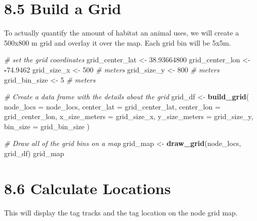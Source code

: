 \documentclass[
]{book}
\newenvironment{Shaded}{\begin{snugshade}}{\end{snugshade}}
\newcommand{\AttributeTok}[1]{\textcolor[rgb]{0.13,0.29,0.53}{#1}}
\newcommand{\CommentTok}[1]{\textcolor[rgb]{0.56,0.35,0.01}{\textit{#1}}}
\newcommand{\DecValTok}[1]{\textcolor[rgb]{0.00,0.00,0.81}{#1}}
\newcommand{\FloatTok}[1]{\textcolor[rgb]{0.00,0.00,0.81}{#1}}
\newcommand{\FunctionTok}[1]{\textcolor[rgb]{0.13,0.29,0.53}{\textbf{#1}}}
\newcommand{\NormalTok}[1]{#1}
\newcommand{\OtherTok}[1]{\textcolor[rgb]{0.56,0.35,0.01}{#1}}
\newcommand{\SpecialCharTok}[1]{\textcolor[rgb]{0.81,0.36,0.00}{\textbf{#1}}}
\begin{document}
\section{8.5 Build a Grid}\label{build-a-grid}

To actually quantify the amount of habitat an animal uses, we will create a 500x800 m grid and overlay it over the map. Each grid bin will be 5x5m.

\begin{Shaded}
\begin{Highlighting}[]
\CommentTok{\# set the grid coordinates}
\NormalTok{grid\_center\_lat }\OtherTok{\textless{}{-}} \FloatTok{38.93664800}
\NormalTok{grid\_center\_lon }\OtherTok{\textless{}{-}} \SpecialCharTok{{-}}\FloatTok{74.9462}
\NormalTok{grid\_size\_x }\OtherTok{\textless{}{-}} \DecValTok{500} \CommentTok{\# meters}
\NormalTok{grid\_size\_y }\OtherTok{\textless{}{-}} \DecValTok{800} \CommentTok{\# meters}
\NormalTok{grid\_bin\_size }\OtherTok{\textless{}{-}} \DecValTok{5} \CommentTok{\# meters}

\CommentTok{\# Create a data frame with the details about the grid}
\NormalTok{grid\_df }\OtherTok{\textless{}{-}} \FunctionTok{build\_grid}\NormalTok{(}
  \AttributeTok{node\_locs =}\NormalTok{ node\_locs,}
  \AttributeTok{center\_lat =}\NormalTok{ grid\_center\_lat,}
  \AttributeTok{center\_lon =}\NormalTok{ grid\_center\_lon,}
  \AttributeTok{x\_size\_meters =}\NormalTok{ grid\_size\_x,}
  \AttributeTok{y\_size\_meters =}\NormalTok{ grid\_size\_y,}
  \AttributeTok{bin\_size =}\NormalTok{ grid\_bin\_size}
\NormalTok{)}

\CommentTok{\# Draw all of the grid bins on a map}
\NormalTok{grid\_map }\OtherTok{\textless{}{-}} \FunctionTok{draw\_grid}\NormalTok{(node\_locs, grid\_df)}
\NormalTok{grid\_map}
\end{Highlighting}
\end{Shaded}

\section{8.6 Calculate Locations}\label{calculate-locations}

This will display the tag tracks and the tag location on the node grid map.
\end{document}

